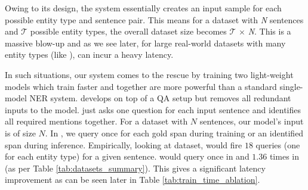 Owing to its design, the  system essentially creates an input sample for each possible entity type and sentence pair. This means for a dataset with \textit{N} sentences and $\mathcal{T}$ possible entity types, the overall dataset size becomes $\mathcal{T}$ $\times$ \textit{N}. This is a massive blow-up and as we see later, for large real-world datasets with many entity types (like ),  can incur a heavy latency.

In such situations, our \modelname{} system comes to the rescue by training two light-weight models which train faster and together are more powerful than a standard single-model NER system. \modelname{} develops on top of a QA setup but removes all redundant inputs to the model. \spandetect{} just asks one question for each input sentence and identifies all required mentions together. For a dataset with $N$ sentences, our model's input is of size $N$. In \spanclass{}, we query once for each gold span during training or an identified span during inference. %
Empirically, looking at  dataset,  would fire $18$ queries (one for each entity type) for a given sentence. \modelname{} would query once in \spandetect{} and $1.36$ times in \spanclass{} (as per Table \ref{tab:datasets_summary}). This gives a significant latency improvement as can be seen later in Table \ref{tab:train_time_ablation}. 
